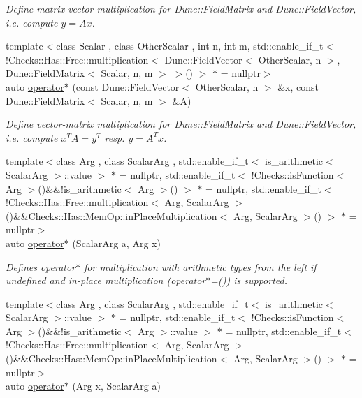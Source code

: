 \begin{DoxyCompactItemize}
\begin{DoxyCompactList}\small\item\em \-Define matrix-\/vector multiplication for \-Dune\-::\-Field\-Matrix and \-Dune\-::\-Field\-Vector, i.\-e. compute $y=Ax$. \end{DoxyCompactList}\item 
{\footnotesize template$<$class Scalar , class Other\-Scalar , int n, int m, std\-::enable\-\_\-if\-\_\-t$<$ !\-Checks\-::\-Has\-::\-Free\-::multiplication$<$ Dune\-::\-Field\-Vector$<$ Other\-Scalar, n $>$, Dune\-::\-Field\-Matrix$<$ Scalar, n, m $>$ $>$() $>$ $\ast$  = nullptr$>$ }\\auto \hyperlink{namespaceFunG_a19a9d7b55b56f5101560034413a1dbfe}{operator$\ast$} (const \-Dune\-::\-Field\-Vector$<$ \-Other\-Scalar, n $>$ \&x, const \-Dune\-::\-Field\-Matrix$<$ \-Scalar, n, m $>$ \&\-A)
\begin{DoxyCompactList}\small\item\em \-Define vector-\/matrix multiplication for \-Dune\-::\-Field\-Matrix and \-Dune\-::\-Field\-Vector, i.\-e. compute $x^T A = y^T$ resp. $y=A^T x$. \end{DoxyCompactList}\item 
{\footnotesize template$<$class Arg , class Scalar\-Arg , std\-::enable\-\_\-if\-\_\-t$<$ is\-\_\-arithmetic$<$ Scalar\-Arg $>$\-::value $>$ $\ast$  = nullptr, std\-::enable\-\_\-if\-\_\-t$<$ !\-Checks\-::is\-Function$<$ Arg $>$()\&\&!is\-\_\-arithmetic$<$ Arg $>$() $>$ $\ast$  = nullptr, std\-::enable\-\_\-if\-\_\-t$<$ !\-Checks\-::\-Has\-::\-Free\-::multiplication$<$ Arg, Scalar\-Arg $>$()\&\&\-Checks\-::\-Has\-::\-Mem\-Op\-::in\-Place\-Multiplication$<$ Arg, Scalar\-Arg $>$() $>$ $\ast$  = nullptr$>$ }\\auto \hyperlink{namespaceFunG_a9b303ce8718a6f64b035e7e782370734}{operator$\ast$} (\-Scalar\-Arg a, \-Arg x)
\begin{DoxyCompactList}\small\item\em \-Defines operator$\ast$ for multiplication with arithmetic types from the left if undefined and in-\/place multiplication (operator$\ast$=()) is supported. \end{DoxyCompactList}\item 
{\footnotesize template$<$class Arg , class Scalar\-Arg , std\-::enable\-\_\-if\-\_\-t$<$ is\-\_\-arithmetic$<$ Scalar\-Arg $>$\-::value $>$ $\ast$  = nullptr, std\-::enable\-\_\-if\-\_\-t$<$ !\-Checks\-::is\-Function$<$ Arg $>$()\&\&!is\-\_\-arithmetic$<$ Arg $>$\-::value $>$ $\ast$  = nullptr, std\-::enable\-\_\-if\-\_\-t$<$ !\-Checks\-::\-Has\-::\-Free\-::multiplication$<$ Arg, Scalar\-Arg $>$()\&\&\-Checks\-::\-Has\-::\-Mem\-Op\-::in\-Place\-Multiplication$<$ Arg, Scalar\-Arg $>$() $>$ $\ast$  = nullptr$>$ }\\auto \hyperlink{namespaceFunG_a3cd5a2cb1abba842154691bb84aab896}{operator$\ast$} (\-Arg x, \-Scalar\-Arg a)

\end{DoxyCompactItemize}
